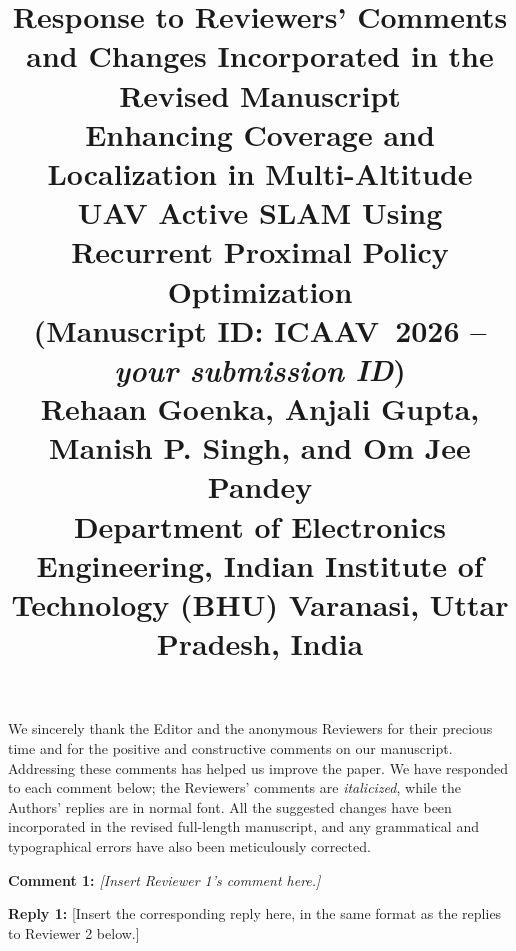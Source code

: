 \documentclass[10pt]{article}
\begin{document}
\title{\small Response to Reviewers' Comments and Changes Incorporated in the Revised Manuscript\\
\vspace{2.0em}
{\Large \bf Enhancing Coverage and Localization in Multi-Altitude UAV Active SLAM Using Recurrent Proximal Policy Optimization}\\
\vspace{0.4em}
\large{(Manuscript ID: ICAAV~2026 -- \textit{your submission ID})}\\
\vspace{1.0em}
\small Rehaan Goenka, Anjali Gupta, Manish P. Singh, and Om Jee Pandey\\
\vspace{0.3em}
Department of Electronics Engineering, Indian Institute of Technology (BHU) Varanasi, Uttar Pradesh, India}
\date{}
\maketitle
\vspace{-1.5em}

We sincerely thank the Editor and the anonymous Reviewers for their precious time and for the positive and constructive comments on our manuscript. Addressing these comments has helped us improve the paper. We have responded to each comment below; the Reviewers' comments are \textit{italicized}, while the Authors' replies are in normal font. All the suggested changes have been incorporated in the revised full-length manuscript, and any grammatical and typographical errors have also been meticulously corrected.\\

\vspace{1em}

\vspace{0.5em}

\hspace{-0.7cm} {\bf Comment 1:}{\it{ [Insert Reviewer 1's comment here.] }}

\hspace{-0.7cm} {{\bf{Reply 1:}} [Insert the corresponding reply here, in the same format as the replies to Reviewer 2 below.]}
\end{document}
